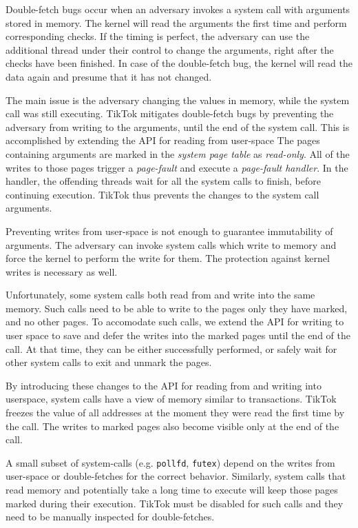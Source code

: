 \documentclass[conference]{IEEEtran}
\newcommand{\sysname}{TikTok}
\begin{document}
Double-fetch bugs occur when an adversary invokes a system call with arguments
stored in memory. The kernel will read the arguments the first time and perform
corresponding checks. If the timing is perfect, the adversary can use the
additional thread under their control to change the arguments, right after the
checks have been finished. In case of the double-fetch bug, the kernel
will read the data again and presume that it has not changed.

The main issue is the adversary changing the values in memory, while the system
call was still executing. \sysname{} mitigates double-fetch bugs by preventing the
adversary from writing to the arguments, until the end of the system call. This
is accomplished by extending the API for reading from user-space The pages
containing arguments are marked in the \emph{system page table} as
\emph{read-only}. All of the writes to those pages trigger a \emph{page-fault}
and execute a \emph{page-fault handler}. In the handler, the offending threads
wait for all the system calls to finish, before continuing execution. \sysname
thus prevents the changes to the system call arguments.

Preventing writes from user-space is not enough to guarantee immutability of arguments.
The adversary can invoke system calls which write to memory and force the kernel
to perform the write for them. The protection against kernel writes is necessary
as well.

Unfortunately, some system calls both read from and write into the same memory.
Such calls need to be able to write to the pages only they have marked, and no
other pages. To accomodate such calls, we extend the API for writing to user
space to save and defer the writes into the marked pages until the end of the
call. At that time, they can be either successfully performed, or safely wait
for other system calls to exit and unmark the pages.

By introducing these changes to the API for reading from and writing into userspace,
system calls have a view of memory similar to transactions. \sysname{} freezes the
value of all addresses at the moment they were read the first time by the call. 
The writes to marked pages also become visible only at the end of the call. 

A small subset of system-calls (e.g. \texttt{pollfd}, \texttt{futex}) depend on
the writes from user-space or double-fetches for the correct behavior. Similarly,
system calls that read memory and potentially take a long time to execute will
keep those pages marked during their execution. \sysname{} must be disabled for
such calls and they need to be manually inspected for double-fetches.
\end{document}
